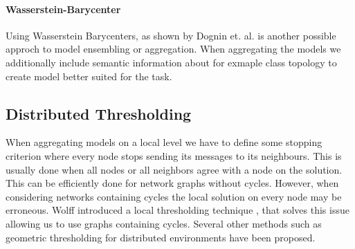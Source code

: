     \paragraph{Wasserstein-Barycenter}
      Using Wasserstein Barycenters, as shown by Dognin et. al. \cite{dognin2019wasserstein} is another possible approch to model ensembling or aggregation. When aggregating the models we additionally include semantic information about for exmaple class topology to create model better suited for the task.
   

    \subsection{Distributed Thresholding} 
    When aggregating models on a local level we have to define some stopping criterion where every node stops sending its messages to its neighbours.
    This is usually done when all nodes or all neighbors agree with a node on the solution.
    This can be efficiently done for network graphs without cycles.
    However, when considering networks containing cycles the local solution on every node may be erroneous.
    Wolff introduced a local thresholding technique  \cite{wolff2013local}, that solves this issue allowing us to use graphs containing cycles.
    Several other methods such as geometric thresholding \cite{sharfman2007geometric} \cite{keren2011shape} for distributed environments have been proposed.


    

